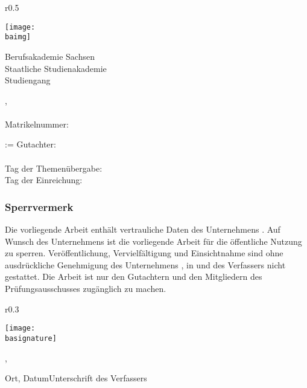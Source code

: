 \documentclass[ngerman,12pt]{article}
\makeatletter
\newcommand{\printcorrectors}[1]{
  	\@for\next:=#1\do
    	{Gutachter: \next\\}%
	}
\makeatother
\begin{document}
\begin{titlepage}
	\begin{wrapfigure}[3]{r}{0.5\textwidth}
		\begin{center}
			\vspace{-18pt}
			\texttt{[image: \\baimg]}
		\end{center}
	\end{wrapfigure}
	\noindent
	\normalsize
	Berufsakademie Sachsen \\ Staatliche Studienakademie \baplace{} \\ Studiengang \bacourse{} \\
	\par
	\vspace{5cm}
	\begin{center}
		\Huge
		\textbf{\batitle{}}
		\par
		\vspace{4cm}
		\normalsize
		\balastname{}, \bafirstname{} \\
		\bacompany{}\\
		Matrikelnummer: \banumber{}
	\end{center}
	\vfill
	\printcorrectors{\bacorrector{}}\\
	Tag der Themenübergabe: \bathemedate{} \\
	Tag der Einreichung: \bareturndate{}
\end{titlepage}
\addtocounter{page}{1}
\newpage

\subsubsection*{Sperrvermerk}
Die vorliegende Arbeit enthält vertrauliche Daten des Unternehmens \bacompany{}.
Auf Wunsch des Unternehmens \bacompany{} ist die vorliegende Arbeit für die öffentliche Nutzung zu sperren.
Veröffentlichung, Vervielfältigung und Einsichtnahme sind ohne ausdrückliche Genehmigung des Unternehmens \bacompany{}, in \bacompanyplace{} und des Verfassers \bafirstname{} \balastname{} nicht gestattet.
Die Arbeit ist nur den Gutachtern und den Mitgliedern des Prüfungsausschusses zugänglich zu machen.
\bigskip\par
\begin{wrapfigure}[1]{r}{0.3\textwidth}
	\begin{center}
		\vspace{-64pt}
		\texttt{[image: \\basignature]}
	\end{center}
\end{wrapfigure}
\bigskip\bigskip
\par\noindent
\baplace{}, \bareturndate{}
\bigskip
\par\noindent
Ort, Datum\hfill Unterschrift des Verfassers
\newpage
\end{document}
